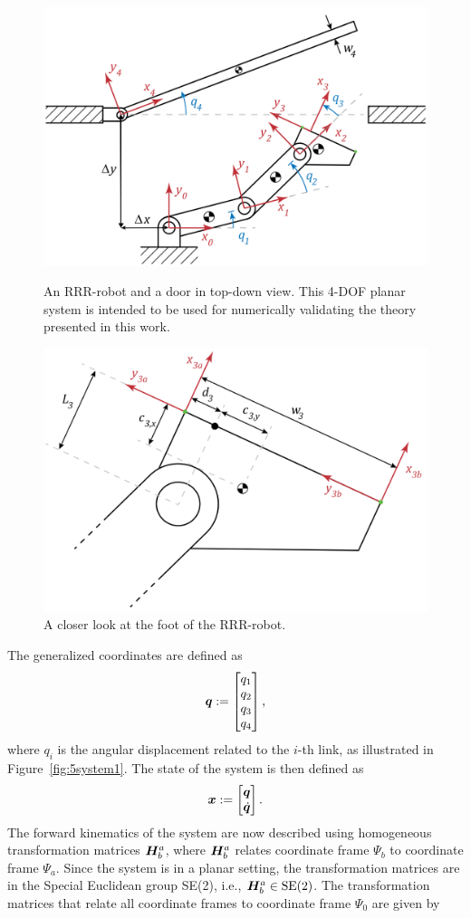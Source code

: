 \documentclass[../DC2019003Bouma.tex]{subfiles}
\begin{document}
%
%
\begin{figure}[bt!]
\centering
\includegraphics[width=.7\textwidth]{system.PNG}\caption{An RRR-robot and a door in top-down view. This 4-DOF planar system is intended to be used for numerically validating the theory presented in this work.}\label{fig:5system1}
\includegraphics[width=.7\textwidth]{system2.PNG}\caption{A closer look at the foot of the RRR-robot.}
\label{fig:5system2}
\end{figure}

The generalized coordinates are defined as 
\begin{align}
{\boldsymbol{q}} := \begin{bmatrix}
q_1\\q_2\\q_3\\q_4
\end{bmatrix},
\end{align}
where $q_i$ is the angular displacement related to the $i$-th link, as illustrated in Figure~\ref{fig:5system1}. The state of the system is then defined as
\begin{align}
{\boldsymbol{x}} := \begin{bmatrix}
{\boldsymbol{q}}\\\dot{{\boldsymbol{q}}}
\end{bmatrix}.
\end{align}
The forward kinematics of the system are now described using homogeneous transformation matrices ${\boldsymbol{H}}^a_b$, where ${\boldsymbol{H}}^a_b$ relates coordinate frame $\Psi_b$ to coordinate frame $\Psi_a$. Since the system is in a planar setting, the transformation matrices are in the Special Euclidean group SE(2), i.e., ${\boldsymbol{H}}^a_b\in \textnormal{SE}(2)$. The transformation matrices that relate all coordinate frames to coordinate frame $\Psi_0$ are given by
\end{document}
